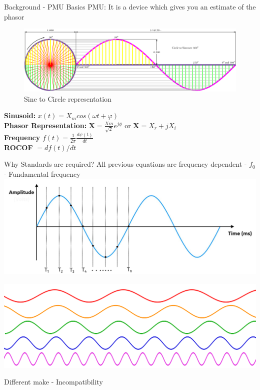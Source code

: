 \documentclass{beamer}
\begin{document}
   \begin{frame}{Background - PMU Basics}
   PMU: It is a device which gives you an estimate of the phasor 
   \begin{figure}
   \includegraphics*[scale = 0.2]{Circle-To-Sine-Wave.png}
   \caption{Sine to Circle representation \cite{site:westau}}
   \end{figure}

   \textbf{Sinusoid:} \textbf{$x(t) = X_m cos(\omega t + \varphi)$} \\
	\textbf{Phasor Representation:} $\textbf{X} = \frac{Xm}{\sqrt{2}}e^{j\phi} $ or $\textbf{X} = X_r+jX_i$ \\
	\textbf{Frequency} $f(t) = \frac{1}{2\pi}\frac{d\psi(t)}{dt}$\\
	\textbf{ROCOF} $= df(t)/dt$
   
   \end{frame}

\begin{frame}{Why Standards are required?}
\centering
All previous equations are frequency dependent - $f_0$ - Fundamental frequency
\includegraphics[scale=0.2]{sine_sampled.png} \\
\pause

\includegraphics[scale=0.1]{multisine.png}

\pause

\hspace{50pt}Different make - Incompatibility 
\end{frame}
   
\end{document}
